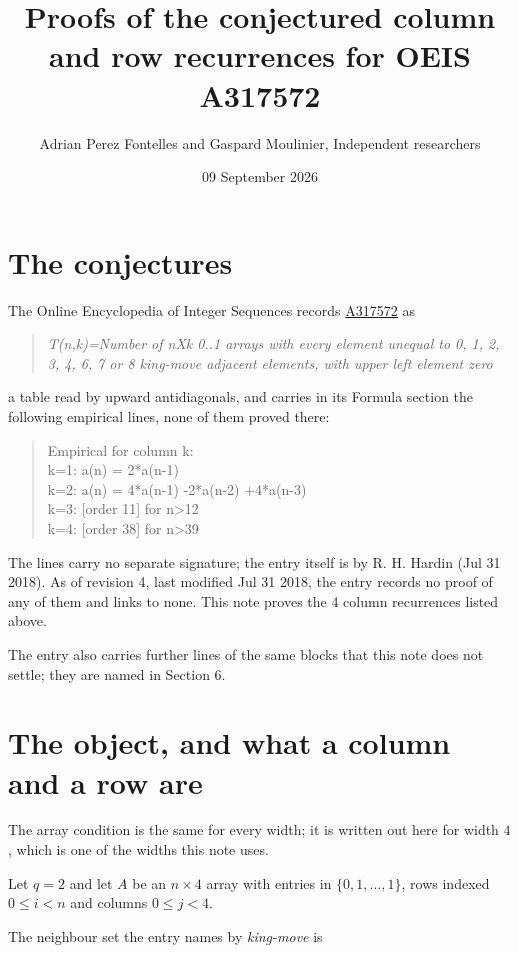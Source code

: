 \documentclass[11pt]{article}
\title{Proofs of the conjectured column and row recurrences for OEIS A317572}
\author{Adrian Perez Fontelles and Gaspard Moulinier, Independent researchers}
\date{09 September 2026}
\theoremstyle{definition}
\begin{document}
\maketitle
\section{The conjectures}

The Online Encyclopedia of Integer Sequences records \href{https://oeis.org/A317572}{A317572} as

\begin{quote}\itshape T(n,k)=Number of nXk 0..1 arrays with every element unequal to 0, 1, 2, 3, 4, 6, 7 or 8 king-move adjacent elements, with upper left element zero\end{quote}

a table read by upward antidiagonals, and carries in its Formula section the following empirical lines, none of them proved there:

\begin{quote}\ttfamily Empirical for column k:\\
k=1: a(n) = 2*a(n-1)\\k=2: a(n) = 4*a(n-1) -2*a(n-2) +4*a(n-3)\\k=3: [order 11] for n>12\\k=4: [order 38] for n>39\end{quote}

The lines carry no separate signature; the entry itself is by R. H. Hardin (Jul 31 2018). As of revision 4, last modified Jul 31 2018, the entry records no proof of any of them and links to none. This note proves the 4 column recurrences listed above.

The entry also carries further lines of the same blocks that this note does not settle; they are named in Section 6.

\section{The object, and what a column and a row are}

The array condition is the same for every width; it is written out here for width $4$, which is one of the widths this note uses.

Let $q = 2$ and let $A$ be an $n \times 4$ array with entries in $\{0,1,\dots,1\}$, rows indexed $0 \le i < n$ and columns $0 \le j < 4$.

The neighbour set the entry names by {\itshape king-move} is
\end{document}
